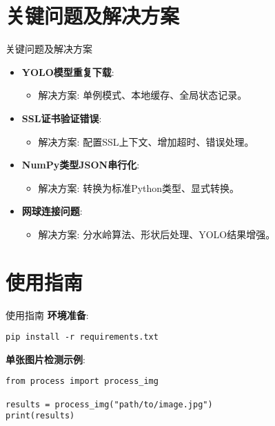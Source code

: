 \documentclass{beamer}
\begin{document}
\section{关键问题及解决方案}
\begin{frame}{关键问题及解决方案}
    \begin{itemize}
        \item \textbf{YOLO模型重复下载}:
            \begin{itemize}
                \item 解决方案: 单例模式、本地缓存、全局状态记录。
            \end{itemize}
        \item \textbf{SSL证书验证错误}:
            \begin{itemize}
                \item 解决方案: 配置SSL上下文、增加超时、错误处理。
            \end{itemize}
        \item \textbf{NumPy类型JSON串行化}:
            \begin{itemize}
                \item 解决方案: 转换为标准Python类型、显式转换。
            \end{itemize}
        \item \textbf{网球连接问题}:
            \begin{itemize}
                \item 解决方案: 分水岭算法、形状后处理、YOLO结果增强。
            \end{itemize}
    \end{itemize}
\end{frame}

\section{使用指南}
\begin{frame}[fragile]{使用指南} %
    \textbf{环境准备}:
\begin{verbatim}
pip install -r requirements.txt
\end{verbatim}

    \vspace{0.5cm}
    \textbf{单张图片检测示例}:
\begin{verbatim}
from process import process_img

results = process_img("path/to/image.jpg")
print(results)
\end{verbatim}
\end{frame}
\end{document}
